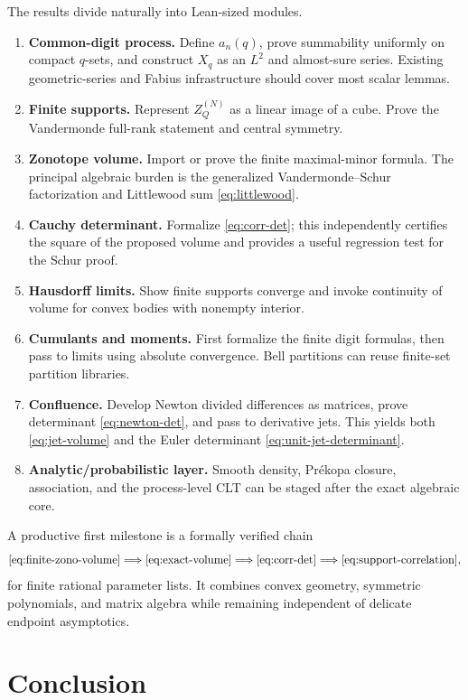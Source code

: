 \documentclass[11pt,a4paper]{article}
\theoremstyle{definition}
\theoremstyle{remark}
\begin{document}
The results divide naturally into Lean-sized modules.

\begin{enumerate}[leftmargin=2.2em,label=\textbf{F\arabic*.}]
\item \textbf{Common-digit process.}  Define $a_n(q)$, prove summability uniformly on compact $q$-sets, and construct $X_q$ as an $L^2$ and almost-sure series.  Existing geometric-series and Fabius infrastructure should cover most scalar lemmas.
\item \textbf{Finite supports.}  Represent $Z_Q^{(N)}$ as a linear image of a cube.  Prove the Vandermonde full-rank statement and central symmetry.
\item \textbf{Zonotope volume.}  Import or prove the finite maximal-minor formula.  The principal algebraic burden is the generalized Vandermonde--Schur factorization and Littlewood sum \eqref{eq:littlewood}.
\item \textbf{Cauchy determinant.}  Formalize \eqref{eq:corr-det}; this independently certifies the square of the proposed volume and provides a useful regression test for the Schur proof.
\item \textbf{Hausdorff limits.}  Show finite supports converge and invoke continuity of volume for convex bodies with nonempty interior.
\item \textbf{Cumulants and moments.}  First formalize the finite digit formulas, then pass to limits using absolute convergence.  Bell partitions can reuse finite-set partition libraries.
\item \textbf{Confluence.}  Develop Newton divided differences as matrices, prove determinant \eqref{eq:newton-det}, and pass to derivative jets.  This yields both \eqref{eq:jet-volume} and the Euler determinant \eqref{eq:unit-jet-determinant}.
\item \textbf{Analytic/probabilistic layer.}  Smooth density, Pr\'ekopa closure, association, and the process-level CLT can be staged after the exact algebraic core.
\end{enumerate}

A productive first milestone is a formally verified chain
\[
 \eqref{eq:finite-zono-volume}
 \Longrightarrow\eqref{eq:exact-volume}
 \Longrightarrow\eqref{eq:corr-det}
 \Longrightarrow\eqref{eq:support-correlation},
\]
for finite rational parameter lists.  It combines convex geometry, symmetric polynomials, and matrix algebra while remaining independent of delicate endpoint asymptotics.

\section{Conclusion}
\label{sec:conclusion}
\end{document}
